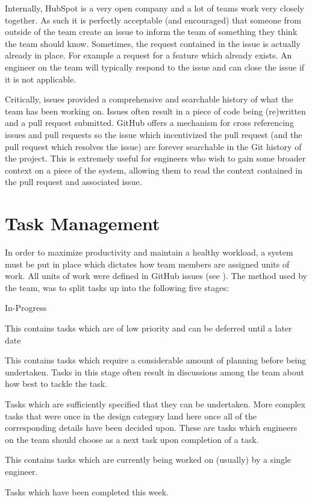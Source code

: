 Internally, HubSpot is a very open company and a lot of teams work very closely together. As such it is perfectly acceptable (and encouraged) that someone from outside of the team create an issue to inform the team of something they think the team should know. Sometimes, the request contained in the issue is actually already in place. For example a request for a feature which already exists. An engineer on the team will typically respond to the issue and can close the issue if it is not applicable. 

Critically, issues provided a comprehensive and searchable history of what the team has been working on. Issues often result in a piece of code being (re)written and a pull request submitted. GitHub offers a mechanism for cross referencing issues and pull requests so the issue which incentivized the pull request (and the pull request which resolves the issue) are forever searchable in the Git history of the project. This is extremely useful for engineers who wish to gain some broader context on a piece of the system, allowing them to read the context contained in the pull request and associated issue. 

\section{Task Management}
In order to maximize productivity and maintain a healthy workload, a system must be put in place which dictates how team members are assigned units of work. All units of work were defined in GitHub issues (see ). The method used by the \team{} team, was to split tasks up into the following five stages:

\begin{labeling}{In-Progress}
	\item [Backlog] This contains tasks which are of low priority and can be deferred until a later date
	\item [Design] This contains tasks which require a considerable amount of planning before being undertaken. Tasks in this stage often result in discussions among the team about how best to tackle the task.
	\item [Ready] Tasks which are sufficiently specified that they can be undertaken. More complex tasks that were once in the design category land here once all of the corresponding details have been decided upon. These are tasks which engineers on the team should choose as a next task upon completion of a task.
	\item [In-Progress] This contains tasks which are currently being worked on (usually) by a single engineer.
	\item [Completed] Tasks which have been completed this week.
\end{labeling}

